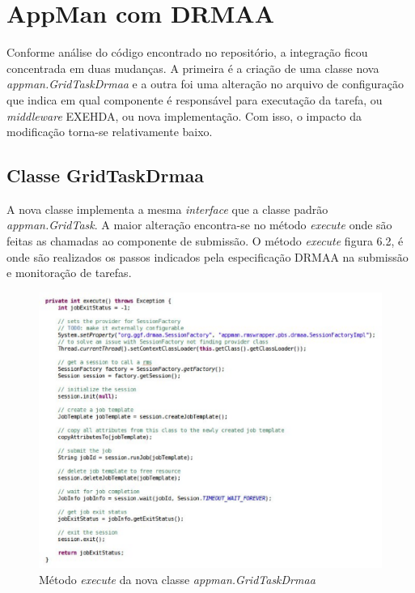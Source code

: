 \section{AppMan com DRMAA}

Conforme análise do código encontrado no repositório, a integração ficou concentrada em duas mudanças. A primeira é a criação de uma classe nova \emph{appman.GridTaskDrmaa} e a outra foi uma alteração no arquivo de configuração que indica em qual componente é responsável para executação da tarefa, ou \emph{middleware} EXEHDA, ou nova implementação. Com isso, o impacto da modificação torna-se relativamente baixo. 

\subsection{Classe GridTaskDrmaa}

A nova classe implementa a mesma \emph{interface} que a classe padrão \emph{appman.GridTask}. A maior alteração encontra-se no método \emph{execute} onde são feitas as chamadas ao componente de submissão. O método \emph{execute} figura 6.2, é onde são realizados os passos indicados pela especificação DRMAA na submissão e monitoração de tarefas.

\begin{figure}[htb]
\begin{center}
\includegraphics[scale=0.65]{./img/execute.eps}
\caption{Método \emph{execute} da nova classe \emph{appman.GridTaskDrmaa}}
\label{fig:UML_DRMAA}
\end{center}
\end{figure}

